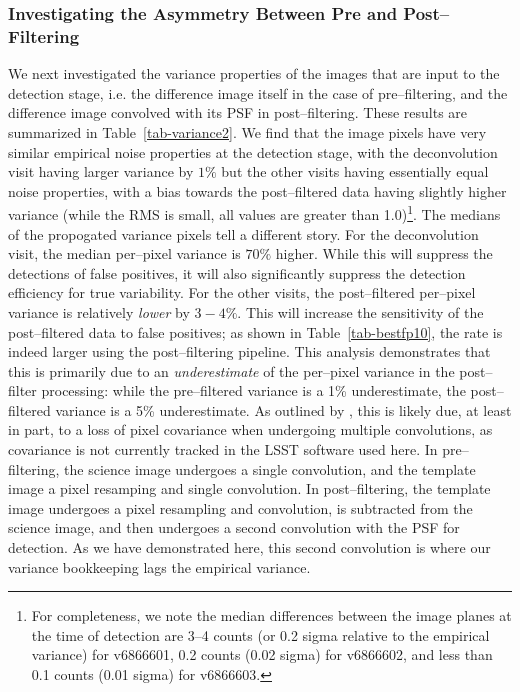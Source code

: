 \documentclass[floatfix, apj]{emulateapj}
\begin{document}
\subsubsection{Investigating the Asymmetry Between Pre and Post--Filtering}

We next investigated the variance properties of the images that are input to the detection stage, i.e. the difference image itself in the case of pre--filtering, and the difference image convolved with its PSF in post--filtering.
These results are summarized in Table~\ref{tab-variance2}.
We find that the image pixels have very similar empirical noise properties at the detection stage, with the deconvolution visit having larger variance by $1\%$ but the other visits having essentially equal noise properties, with a bias towards the post--filtered data having slightly higher variance (while the RMS is small, all values are greater than 1.0)\footnote{For completeness, we note the median differences between the image planes at the time of detection are 3--4 counts (or 0.2 sigma relative to the empirical variance) for v6866601, 0.2 counts (0.02 sigma) for v6866602, and less than 0.1 counts (0.01 sigma) for v6866603.}.
The medians of the propogated variance pixels tell a different story.
For the deconvolution visit, the median per--pixel variance is $70\%$ higher.
While this will suppress the detections of false positives, it will also significantly suppress the detection efficiency for true variability.
For the other visits, the post--filtered per--pixel variance is relatively {\it lower} by $3-4\%$.
This will increase the sensitivity of the post--filtered data to false positives; as shown in Table~\ref{tab-bestfp10}, the rate is indeed larger using the post--filtering pipeline.
This analysis demonstrates that this is primarily due to an {\it underestimate} of the per--pixel variance in the post--filter processing: while the pre--filtered variance is a 1\% underestimate, the post--filtered variance is a 5\% underestimate.
As outlined by \cite{Price-Stacking}, this is likely due, at least in part, to a loss of pixel covariance when undergoing multiple convolutions, as covariance is not currently tracked in the LSST software used here.
In pre--filtering, the science image undergoes a single convolution, and the template image a pixel resamping and single convolution.
In post--filtering, the template image undergoes a pixel resampling and convolution, is subtracted from the science image, and then undergoes a second convolution with the PSF for detection.
As we have demonstrated here, this second convolution is where our variance bookkeeping lags the empirical variance.
\end{document}
